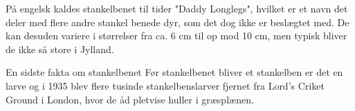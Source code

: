 \begin{minipage}[t]{130mm}
På engelsk kaldes stankelbenet til tider "Daddy Longlegs", hvilket er et navn det deler med flere andre stankel benede dyr, som det dog ikke er beslægtet med. De kan desuden variere i størrelser fra ca. 6 cm til op mod 10 cm, men typisk bliver de ikke så store i Jylland.

En sidste fakta om stankelbenet
Før stankelbenet bliver et stankelben er det en larve og i 1935 blev flere tusinde stankelbenslarver fjernet fra Lord's Criket Ground i London, hvor de åd pletvise huller i græsplænen.

\end{minipage}
